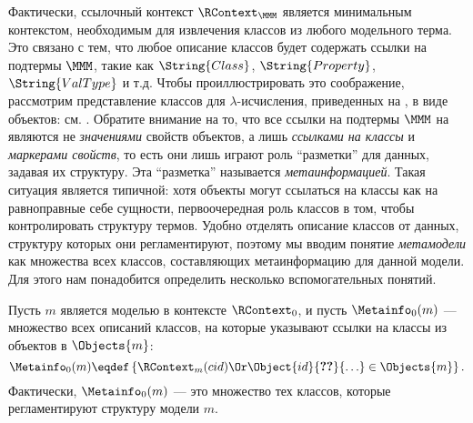 Фактически, ссылочный контекст $\RContext_\MMM$ является минимальным контекстом, необходимым для извлечения классов из любого модельного терма. Это связано с тем, что любое описание классов будет содержать ссылки на подтермы $\MMM$, такие как $\String{Class}$, $\String{Property}$, $\String{ValType}$ и т.д. Чтобы проиллюстрировать это соображение, рассмотрим представление классов для $\lambda$-исчисления, приведенных на , в виде объектов: см. . 
%
%
Обратите внимание на то, что все ссылки на подтермы $\MMM$ на  являются не \emph{значениями} свойств объектов, а лишь \emph{ссылками на классы} и \emph{маркерами свойств}, то есть они лишь играют роль ``разметки'' для данных, задавая их структуру. Эта ``разметка'' называется \emph{метаинформацией}. Такая ситуация является типичной: хотя объекты могут ссылаться на классы как на равноправные себе сущности, первоочередная роль классов в том, чтобы контролировать структуру термов. Удобно отделять описание классов от данных, структуру которых они регламентируют, поэтому мы вводим понятие \emph{метамодели} как множества всех классов, составляющих метаинформацию для данной модели. Для этого нам понадобится определить несколько вспомогательных понятий.

Пусть $m$ является моделью в контексте $\RContext_0$, и пусть $\Metainfo_0(m)$ --- множество всех описаний классов, на которые указывают ссылки на классы из объектов в $\Objects{m}$:
$$\Metainfo_0(m) \eqdef \left\{ \RContext_m(cid) \Or \Object{id}{\Ref{cid}}{\ldots} \in \Objects{m}\right\}.$$
Фактически, $\Metainfo_0(m)$ --- это множество тех классов, которые регламентируют структуру модели $m$.


